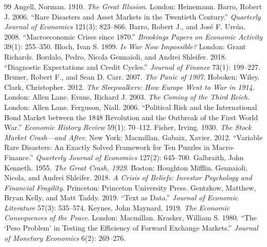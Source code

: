 \documentclass[11pt]{article}
\begin{document}
\begin{thebibliography}{99}
 Angell, Norman. 1910. \emph{The Great Illusion}. London: Heinemann.
 Barro, Robert J. 2006. ``Rare Disasters and Asset Markets in the Twentieth
Century.'' \emph{Quarterly Journal of Economics} 121(3): 823--866.
 Barro, Robert J., and Jos\'e F. Urs\'ua. 2008.
``Macroeconomic Crises since 1870.'' \emph{Brookings Papers on Economic Activity} 39(1): 255--350.
 Bloch, Ivan S. 1899. \emph{Is War Now Impossible?} London: Grant Richards.
 Bordalo, Pedro, Nicola Gennaioli, and Andrei Shleifer. 2018.
``Diagnostic Expectations and Credit Cycles.'' \emph{Journal of Finance} 73(1): 199--227.
 Bruner, Robert F., and Sean D. Carr. 2007. \emph{The Panic of
1907}. Hoboken: Wiley.
 Clark, Christopher. 2012. \emph{The Sleepwalkers: How Europe Went to War in
1914}. London: Allen Lane.
 Evans, Richard J. 2003. \emph{The Coming of the Third Reich}. London: Allen
Lane.
 Ferguson, Niall. 2006. ``Political Risk and the International Bond
Market between the 1848 Revolution and the Outbreak of the First World War.'' \emph{Economic History Review}
59(1): 70--112.
 Fisher, Irving. 1930. \emph{The Stock Market Crash---and After}. New
York: Macmillan.
 Gabaix, Xavier. 2012. ``Variable Rare Disasters: An Exactly Solved
Framework for Ten Puzzles in Macro-Finance.'' \emph{Quarterly Journal of Economics} 127(2): 645--700.
 Galbraith, John Kenneth. 1955. \emph{The Great Crash, 1929}.
Boston: Houghton Mifflin.
 Gennaioli, Nicola, and Andrei Shleifer. 2018. \emph{A
Crisis of Beliefs: Investor Psychology and Financial Fragility}. Princeton: Princeton University Press.
 Gentzkow, Matthew, Bryan Kelly, and Matt Taddy. 2019. ``Text
as Data.'' \emph{Journal of Economic Literature} 57(3): 535--574.
 Keynes, John Maynard. 1919. \emph{The Economic Consequences of the
Peace}. London: Macmillan.
 Krasker, William S. 1980. ``The `Peso Problem' in Testing the
Efficiency of Forward Exchange Markets.'' \emph{Journal of Monetary Economics} 6(2): 269--276.

\end{thebibliography}
\end{document}
